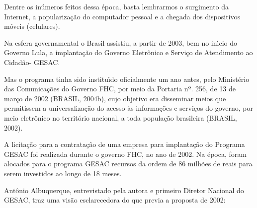 \documentclass[
12pt,		%
openright,	%
twoside,  %
a4paper,			%
chapter=TITLE,		%
english,			%
french,				%
spanish,			%
brazil				%
]{USPSC-classe/USPSC}
\begin{document}
Dentre os  in\'umeros feitos dessa \'epoca, basta lembrarmos o surgimento da Internet, a populariza\c{c}\~ao do computador pessoal e a chegada dos dispositivos m\'oveis (celulares).








Na esfera governamental o Brasil assistiu, a partir de 2003, bem no in\'{\i}cio do Governo Lula, a implanta\c{c}\~ao do Governo Eletr\^onico e Servi\c{c}o de Atendimento ao Cidad\~ao-  GESAC.








Mas o programa tinha sido institu\'{\i}do oficialmente um ano antes, pelo Minist\'erio das Comunica\c{c}\~oes do Governo FHC, por meio  da Portaria nº. 256, de 13 de mar\c{c}o de 2002 (BRASIL, 2004b), cujo  objetivo era disseminar meios que permitissem a universaliza\c{c}\~ao do acesso \`as informa\c{c}\~oes e servi\c{c}os do governo, por meio eletr\^onico no territ\'orio nacional, a toda popula\c{c}\~ao brasileira (BRASIL, 2002).








A licita\c{c}\~ao para a contrata\c{c}\~ao de uma empresa para implanta\c{c}\~ao do Programa GESAC foi realizada durante o governo FHC, no ano de 2002. Na \'epoca, foram alocados para o programa GESAC recursos da ordem de 86 milh\~oes de reais para serem investidos ao longo de 18 meses.








Ant\^onio Albuquerque, entrevistado pela autora e primeiro Diretor Nacional do GESAC, traz uma vis\~ao esclarecedora do que previa a proposta de 2002:
\end{document}
